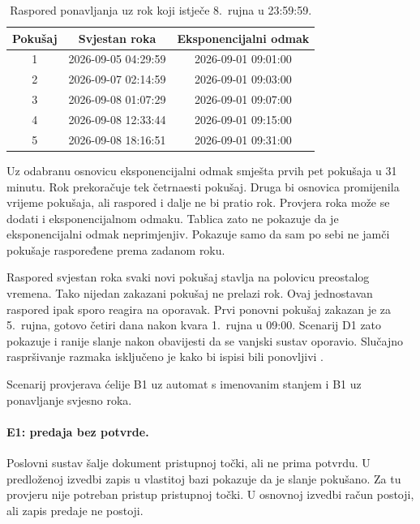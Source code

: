 \begin{table}[H]
\centering
\caption[Raspored ponavljanja prema roku i prema broju pokušaja]{Raspored
ponavljanja uz rok koji istječe 8.~rujna u 23:59:59.}
\label{tab:raspored}
\small
\begin{tabular}{@{}ccc@{}}
\toprule
Pokušaj & Svjestan roka & Eksponencijalni odmak \\
\midrule
1 & 2026-09-05 04:29:59 & 2026-09-01 09:01:00 \\
2 & 2026-09-07 02:14:59 & 2026-09-01 09:03:00 \\
3 & 2026-09-08 01:07:29 & 2026-09-01 09:07:00 \\
4 & 2026-09-08 12:33:44 & 2026-09-01 09:15:00 \\
5 & 2026-09-08 18:16:51 & 2026-09-01 09:31:00 \\
\bottomrule
\end{tabular}
\end{table}

Uz odabranu osnovicu eksponencijalni odmak smješta prvih pet pokušaja u 31
minutu. Rok prekoračuje tek četrnaesti pokušaj. Druga bi osnovica promijenila
vrijeme pokušaja, ali raspored i dalje ne bi pratio rok. Provjera roka može
se dodati i eksponencijalnom odmaku. Tablica zato ne pokazuje da je
eksponencijalni odmak neprimjenjiv. Pokazuje samo da sam po sebi ne jamči
pokušaje raspoređene prema zadanom roku.

Raspored svjestan roka svaki novi pokušaj stavlja na polovicu preostalog
vremena. Tako nijedan zakazani pokušaj ne prelazi rok. Ovaj jednostavan
raspored ipak sporo reagira na oporavak. Prvi ponovni pokušaj zakazan je za
5.~rujna, gotovo četiri dana nakon kvara 1.~rujna u 09:00. Scenarij D1 zato
pokazuje i ranije slanje nakon obavijesti da se vanjski sustav oporavio.
Slučajno raspršivanje razmaka isključeno je kako bi ispisi bili ponovljivi
\cite{brookertimeouts}.

Scenarij provjerava ćelije B1 uz automat s imenovanim stanjem i B1 uz
ponavljanje svjesno roka.

\paragraph{E1: predaja bez potvrde.}
Poslovni sustav šalje dokument pristupnoj točki, ali ne prima potvrdu. U
predloženoj izvedbi zapis u vlastitoj bazi pokazuje da je slanje pokušano.
Za tu provjeru nije potreban pristup pristupnoj točki. U osnovnoj izvedbi
račun postoji, ali zapis predaje ne postoji.


